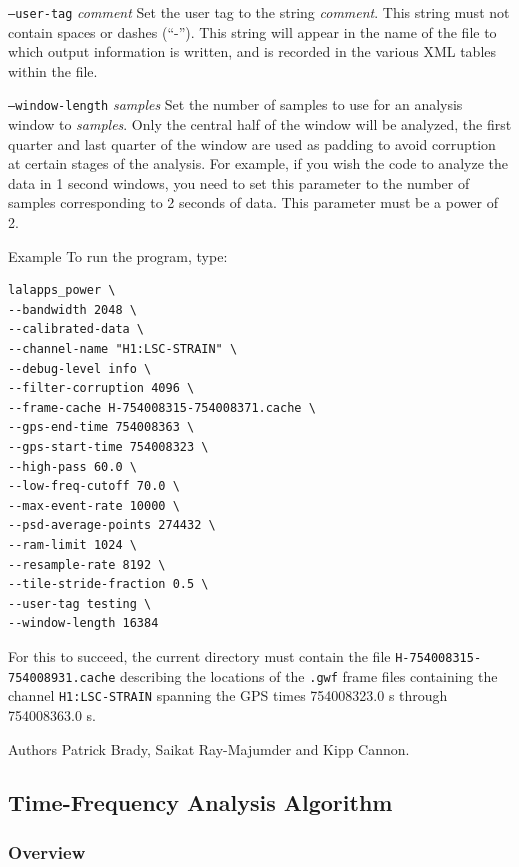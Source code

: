 \documentclass[10pt]{article}
\newcommand{\option}[1]{\texttt{#1}}
\newcommand{\parm}[1]{\textit{#1}}
\newenvironment{entry}%
{\begin{list}{}{\renewcommand{\makelabel}[1]%
{\parbox[b]{\labelwidth}{\makebox[0pt][l]{\textbf{##1}}\\}}%
\setlength{\labelwidth}{1em}%
\setlength{\labelsep}{1em}%
\setlength{\leftmargin}{2em}%
\setlength{\topsep}{\medskipamount}%
\setlength{\itemsep}{\medskipamount}%
\setlength{\parsep}{\medskipamount}%
\setlength{\listparindent}{0pt}}}
{\end{list}}
\begin{document}
\begin{entry}
\begin{entry}
\item[\option{--user-tag} \parm{comment}]
Set the user tag to the string \parm{comment}.  This string must not
contain spaces or dashes (``-'').  This string will appear in the name of
the file to which output information is written, and is recorded in the
various XML tables within the file.

\item[\option{--window-length} \parm{samples}]
Set the number of samples to use for an analysis window to \parm{samples}.
Only the central half of the window will be analyzed, the first quarter and
last quarter of the window are used as padding to avoid corruption at
certain stages of the analysis.  For example, if you wish the code to
analyze the data in 1 second windows, you need to set this parameter to the
number of samples corresponding to 2 seconds of data.  This parameter must
be a power of 2.

\end{entry}


\item[Example]
To run the program, type:
\begin{verbatim}
lalapps_power \
--bandwidth 2048 \
--calibrated-data \
--channel-name "H1:LSC-STRAIN" \
--debug-level info \
--filter-corruption 4096 \
--frame-cache H-754008315-754008371.cache \
--gps-end-time 754008363 \
--gps-start-time 754008323 \
--high-pass 60.0 \
--low-freq-cutoff 70.0 \
--max-event-rate 10000 \
--psd-average-points 274432 \
--ram-limit 1024 \
--resample-rate 8192 \
--tile-stride-fraction 0.5 \
--user-tag testing \
--window-length 16384
\end{verbatim}
For this to succeed, the current directory must contain the file
\texttt{H-754008315-754008931.cache} describing the locations of the
\texttt{.gwf} frame files containing the channel \verb|H1:LSC-STRAIN|
spanning the GPS times 754008323.0 s through 754008363.0 s.

\item[Authors]
Patrick Brady, Saikat Ray-Majumder and Kipp Cannon.  
\end{entry}


\subsection{Time-Frequency Analysis Algorithm}


\subsubsection{Overview}
\end{document}
